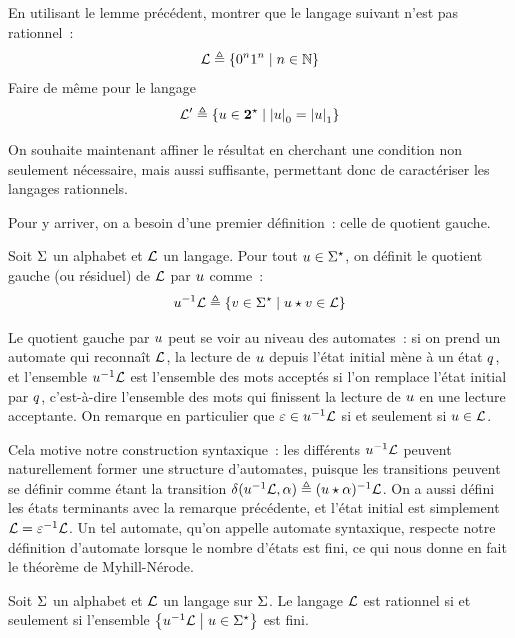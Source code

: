 \begin{exercise}
  En utilisant le lemme précédent, montrer que le langage suivant n'est pas
  rationnel~:
  \[\mathcal L \triangleq \left\{ 0^n1^n \;\middle\vert\; n \in \mathbb N \right\}\]
  Faire de même pour le langage
  \[\mathcal L' \triangleq \left\{ u\in\bm{2}^{\star} \;\middle\vert\; \left|u\right|_0 = \left|u\right|_1 \right\}\]
\end{exercise}

On souhaite maintenant affiner le résultat en cherchant une condition non
seulement nécessaire, mais aussi suffisante, permettant donc de caractériser les
langages rationnels.

Pour y arriver, on a besoin d'une premier définition~: celle de quotient gauche.

\begin{definition}
  Soit $\Sigma$ un alphabet et $\mathcal L$ un langage. Pour tout $u \in \Sigma^{\star}$,
  on définit le quotient gauche (ou résiduel) de $\mathcal L$ par $u$ comme~:
  \[u^{-1}\mathcal L\triangleq \left\{ v \in \Sigma^{\star} \;\middle\vert\; u\mathbin{\star}v \in \mathcal L \right\}\]
\end{definition}

Le quotient gauche par $u$ peut se voir au niveau des automates~: si on
prend un automate qui reconnaît $\mathcal L$, la lecture de $u$ depuis l'état
initial mène à un état $q_{}$, et l'ensemble $u^{-1}\mathcal L$ est l'ensemble des mots
acceptés si l'on remplace l'état initial par $q_{}$, c'est-à-dire l'ensemble
des mots qui finissent la lecture de $u$ en une lecture acceptante. On
remarque en particulier que $\varepsilon \in u^{-1}\mathcal L$ si et seulement si
$u \in \mathcal L$.

Cela motive notre construction syntaxique~: les différents $u^{-1}\mathcal L$ peuvent
naturellement former une structure d'automates, puisque les transitions peuvent
se définir comme étant la transition
$\delta_{}(u^{-1}\mathcal L,\alpha) \triangleq (u\mathbin{\star}\alpha)^{-1}\mathcal L$. On a aussi défini les
états terminants avec la remarque précédente, et l'état initial est simplement
$\mathcal L = \varepsilon^{-1}\mathcal L$. Un tel automate, qu'on appelle automate syntaxique,
respecte notre définition d'automate lorsque le nombre d'états est fini, ce qui
nous donne en fait le théorème de Myhill-Nérode.

\begin{theorem}
  Soit $\Sigma$ un alphabet et $\mathcal L$ un langage sur $\Sigma$. Le langage $\mathcal L$
  est rationnel si et seulement si l'ensemble $\left\{ u^{-1}\mathcal L \;\middle\vert\; u\in\Sigma^{\star} \right\}$
  est fini.
\end{theorem}

